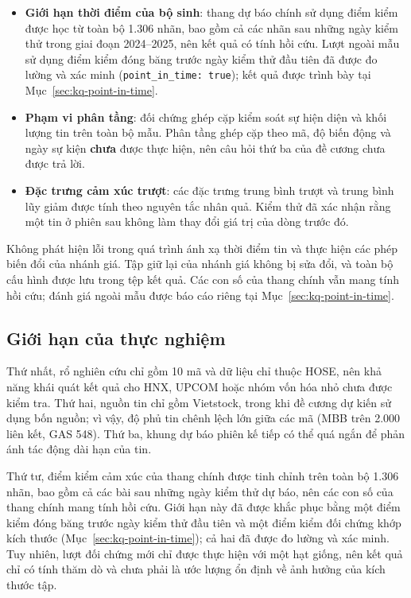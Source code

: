 \documentclass[12pt, a4paper, oneside]{report}
\begin{document}
\begin{itemize}[nosep]
        31/12/2025 rơi sang phiên năm 2026 nên bị loại; không có bản ghi nào thiếu mốc thời
        gian hợp lệ. Độ phủ tin có mức chênh lệch lớn giữa các mã, từ 548 liên kết (GAS) đến
        2.165 liên kết (MBB). Do kết quả theo từng mã chưa được phân tách, ảnh hưởng của mật
        độ tin chưa thể được kết luận.
  \item \textbf{Giới hạn thời điểm của bộ sinh}: thang dự báo chính sử dụng điểm kiểm được
        học từ toàn bộ 1.306 nhãn, bao gồm cả các nhãn sau những ngày kiểm thử trong giai
        đoạn 2024--2025, nên kết quả có tính hồi cứu. Lượt ngoài mẫu sử dụng điểm kiểm đóng
        băng trước ngày kiểm thử đầu tiên đã được đo lường và xác minh
        (\texttt{point\_in\_time: true}); kết quả được trình bày tại
        Mục~\ref{sec:kq-point-in-time}.
  \item \textbf{Phạm vi phân tầng}: đối chứng ghép cặp kiểm soát sự hiện diện và khối lượng
        tin trên toàn bộ mẫu. Phân tầng ghép cặp theo mã, độ biến động và ngày sự kiện
        \textbf{chưa} được thực hiện, nên câu hỏi thứ ba của đề cương chưa được trả lời.
  \item \textbf{Đặc trưng cảm xúc trượt}: các đặc trưng trung bình trượt và trung bình lũy
        giảm được tính theo nguyên tắc nhân quả. Kiểm thử đã xác nhận rằng một tin ở phiên
        sau không làm thay đổi giá trị của dòng trước đó.
\end{itemize}

Không phát hiện lỗi trong quá trình ánh xạ thời điểm tin và thực hiện các phép biến đổi của
nhánh giá. Tập giữ lại của nhánh giá không bị sửa đổi, và toàn bộ cấu hình được lưu trong
tệp kết quả. Các con số của thang chính vẫn mang tính hồi cứu; đánh giá ngoài mẫu được báo
cáo riêng tại Mục~\ref{sec:kq-point-in-time}.

\subsection{Giới hạn của thực nghiệm}
\label{sec:kq-limitations}

Thứ nhất, rổ nghiên cứu chỉ gồm 10 mã và dữ liệu chỉ thuộc HOSE, nên khả năng khái quát
kết quả cho HNX, UPCOM hoặc nhóm vốn hóa nhỏ chưa được kiểm tra. Thứ hai, nguồn tin chỉ
gồm Vietstock, trong khi đề cương dự kiến sử dụng bốn nguồn; vì vậy, độ phủ tin chênh lệch
lớn giữa các mã (MBB trên 2.000 liên kết, GAS 548). Thứ ba, khung dự báo phiên kế tiếp có
thể quá ngắn để phản ánh tác động dài hạn của tin.

Thứ tư, điểm kiểm cảm xúc của thang chính được tinh chỉnh trên toàn bộ 1.306 nhãn,
bao gồm cả các bài sau những ngày kiểm thử dự báo, nên các con số của thang chính mang
tính hồi cứu. Giới hạn này đã được khắc phục bằng một điểm kiểm đóng băng trước ngày kiểm
thử đầu tiên và một điểm kiểm đối chứng khớp kích thước (Mục~\ref{sec:kq-point-in-time});
cả hai đã được đo lường và xác minh. Tuy nhiên, lượt đối chứng mới chỉ được thực hiện với
một hạt giống, nên kết quả chỉ có tính thăm dò và chưa phải là ước lượng ổn định về ảnh
hưởng của kích thước tập.
\end{document}
